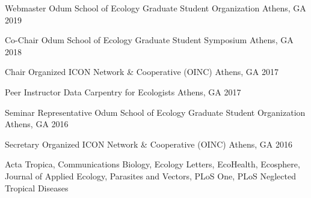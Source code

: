 
\begin{cvhonors}
\cvhonor
    {Webmaster} %
    {Odum School of Ecology Graduate Student Organization} %
    {Athens, GA} %
    {2019} %

\cvhonor
    {Co-Chair} %
    {Odum School of Ecology Graduate Student Symposium} %
    {Athens, GA} %
    {2018} %

\cvhonor
    {Chair} %
    {Organized ICON Network \& Cooperative (OINC)} %
    {Athens, GA} %
    {2017} %

\cvhonor
    {Peer Instructor} %
    {Data Carpentry for Ecologists} %
    {Athens, GA} %
    {2017} %

\cvhonor
    {Seminar Representative} %
    {Odum School of Ecology Graduate Student Organization} %
    {Athens, GA} %
    {2016} %

\cvhonor
    {Secretary} %
    {Organized ICON Network \& Cooperative (OINC)} %
    {Athens, GA} %
    {2016} %

\end{cvhonors}


Acta Tropica, Communications Biology, Ecology Letters, EcoHealth, Ecosphere, Journal of Applied Ecology, Parasites and Vectors, PLoS One, PLoS Neglected Tropical Diseases




